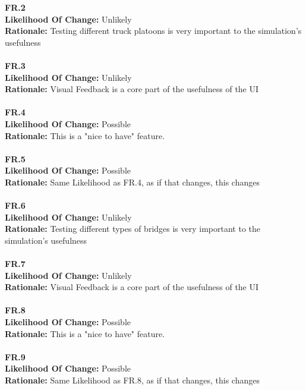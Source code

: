 \documentclass[12pt]{article}
\begin{document}
  \noindent \textbf{FR.2}\\  
  \textbf{Likelihood Of Change:} Unlikely\\ 
  \textbf{Rationale:} Testing different truck platoons is very important to the simulation's usefulness\\\\

  \noindent \textbf{FR.3}\\  
  \textbf{Likelihood Of Change:} Unlikely\\ 
  \textbf{Rationale:} Visual Feedback is a core part of the usefulness of the UI\\\\

  \noindent \textbf{FR.4}\\  
  \textbf{Likelihood Of Change:} Possible\\ 
  \textbf{Rationale:} This is a "nice to have" feature.\\\\

  \noindent \textbf{FR.5}\\  
  \textbf{Likelihood Of Change:} Possible\\ 
  \textbf{Rationale:} Same Likelihood as FR.4, as if that changes, this changes\\\\

  \noindent \textbf{FR.6}\\  
  \textbf{Likelihood Of Change:} Unlikely\\ 
  \textbf{Rationale:} Testing different types of bridges is very important to the simulation's usefulness\\\\

  \noindent \textbf{FR.7}\\  
  \textbf{Likelihood Of Change:} Unlikely\\ 
  \textbf{Rationale:} Visual Feedback is a core part of the usefulness of the UI\\\\

  \noindent \textbf{FR.8}\\  
  \textbf{Likelihood Of Change:} Possible\\ 
  \textbf{Rationale:} This is a "nice to have" feature.\\\\

  \noindent \textbf{FR.9}\\  
  \textbf{Likelihood Of Change:} Possible\\ 
  \textbf{Rationale:} Same Likelihood as FR.8, as if that changes, this changes\\\\
\end{document}

